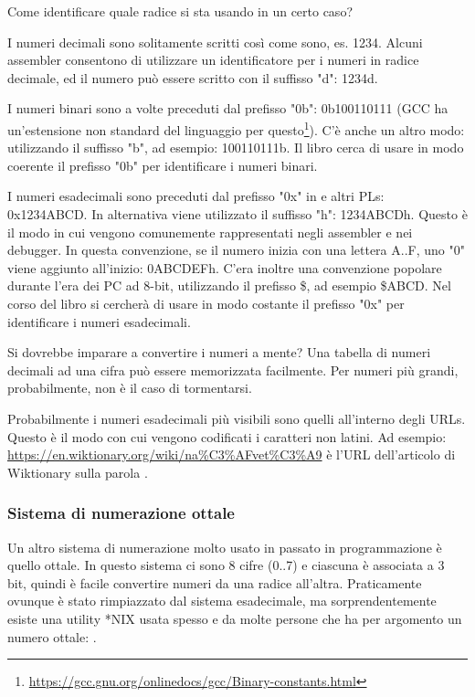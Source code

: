 Come identificare quale radice si sta usando in un certo caso?

I numeri decimali sono solitamente scritti così come sono, es. 1234. Alcuni assembler consentono di utilizzare un identificatore per i numeri in radice decimale, ed il numero può essere scritto con il suffisso "d": 1234d.

I numeri binari sono a volte preceduti dal prefisso "0b": 0b100110111 (\ac{GCC} ha un'estensione non standard del linguaggio per questo\footnote{\url{https://gcc.gnu.org/onlinedocs/gcc/Binary-constants.html}}).
C'è anche un altro modo: utilizzando il suffisso "b", ad esempio: 100110111b.
Il libro cerca di usare in modo coerente il prefisso "0b" per identificare i numeri binari.

I numeri esadecimali sono preceduti dal prefisso "0x" in \CCpp e altri \ac{PL}s: 0x1234ABCD.
In alternativa viene utilizzato il suffisso "h": 1234ABCDh. Questo è il modo in cui vengono comunemente rappresentati negli assembler e nei debugger.
In questa convenzione, se il numero inizia con una lettera A..F, uno "0" viene aggiunto all'inizio: 0ABCDEFh.
C'era inoltre una convenzione popolare durante l'era dei PC ad 8-bit, utilizzando il prefisso \$, ad esempio \$ABCD.
Nel corso del libro si cercherà di usare in modo costante il prefisso "0x" per identificare i numeri esadecimali.

Si dovrebbe imparare a convertire i numeri a mente? Una tabella di numeri decimali ad una cifra può essere memorizzata facilmente.
Per numeri più grandi, probabilmente, non è il caso di tormentarsi.

Probabilmente i numeri esadecimali più visibili sono quelli all'interno degli \ac{URL}s.
Questo è il modo con cui vengono codificati i caratteri non latini.
Ad esempio:
\url{https://en.wiktionary.org/wiki/na\%C3\%AFvet\%C3\%A9} è l'\ac{URL} dell'articolo di Wiktionary sulla parola .

\subsubsection{Sistema di numerazione ottale}

Un altro sistema di numerazione molto usato in passato in programmazione è quello ottale.
In questo sistema ci sono 8 cifre (0..7) e ciascuna è associata a 3 bit, quindi è facile convertire numeri da una radice all'altra.
Praticamente ovunque è stato rimpiazzato dal sistema esadecimale, ma sorprendentemente esiste una utility *NIX usata spesso e da molte persone che ha per argomento un numero ottale: .

